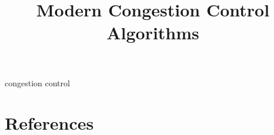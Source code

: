 \documentclass[conference]{IEEEtran}
\begin{document}
\title{Modern Congestion Control Algorithms}

\author{
}

\maketitle

\begin{abstract}

\end{abstract}

\begin{IEEEkeywords}
congestion control
\end{IEEEkeywords}













\section*{References}



\end{document}
